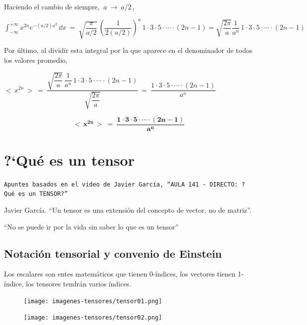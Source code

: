 Haciendo el cambio de siempre, $\ a \ \to \ a/2 \, , \ $

$\displaystyle  \int_{-\infty}^{+\infty} x^{2n} e^{-(a/2)x^2}\, \dd x  \ = \  \sqrt{\dfrac \pi {a/2} } \,  \left( \dfrac {1}{2(a/2)} \right)^n\, 1\cdot 3 \cdot 5 \cdot \cdots \cdot (2n-1)= \sqrt{\dfrac{2\pi}{a}} \dfrac 1 {a^n} \, 1\cdot 3 \cdot 5 \cdot \cdots \cdot (2n-1) $

Por último, al dividir esta integral por la que aparece en el denominador de todos los valores promedio,

$<\, x^{2n} \, > \ = \ \dfrac {\sqrt{\dfrac{2\pi}{a}} \, \dfrac 1 {a^n} \, 1\cdot 3 \cdot 5 \cdot \cdots \cdot (2n-1)}{\sqrt{\dfrac{2\pi}{a}}}  \ = \ \dfrac { 1\cdot 3 \cdot 5 \cdot \cdots \cdot (2n-1)}{a^n}$


\begin{equation}
\label{promedio-x2n}	
\boldsymbol{ \boxed{ \ 
<\, x^{2n} \, > \ = \  \dfrac { 1\cdot 3 \cdot 5 \cdot \cdots \cdot (2n-1)}{a^n}
\ } }
\end{equation}


\color{black}



\chapter{?`Qué es un tensor}


\texttt{Apuntes basados en el video de Javier García, ``AULA 141 - DIRECTO: ?Qué es un TENSOR?''} 



\begin{cita}{Javier García.}
``Un tensor es una extensión del concepto de vector, no de matriz''.

``No se puede ir por la vida sin saber lo que es un tensor''
\end{cita}

\section{Notación tensorial y convenio de Einstein}


\normalsize{Los} escalares son entes matemáticos que tienen 0-índices, los vectores tienen 1-índice, los tensores tendrán varios índices.


\begin{multicols}{2}
	\begin{figure}[H]
		\centering
		\texttt{[image: imagenes-tensores/tensor01.png]}
	\end{figure}
	\begin{figure}[H]
		\centering
		\texttt{[image: imagenes-tensores/tensor02.png]}
	\end{figure}
\end{multicols}

